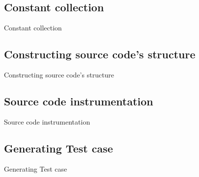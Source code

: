 \documentclass{beamer}
\begin{document}
\subsection{Constant collection}
\begin{frame}{Constant collection}
\end{frame}

\subsection{Constructing source code's structure}
\begin{frame}{Constructing source code's structure}
\end{frame}

\subsection{Source code instrumentation}
\begin{frame}{Source code instrumentation}
\end{frame}

\subsection{Generating Test case}
\begin{frame}{Generating Test case}
\end{frame}
\end{document}
